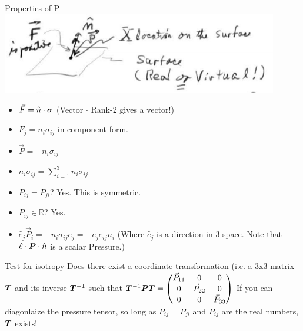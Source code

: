 \documentclass{article}
\begin{document}
\begin{section}{Properties of P}
  \includegraphics[height=100pt]{Day4NotesPics/Fdef}
  \begin{itemize}
    \item  $\vec{F} = \hat{n} \cdot \bm{\sigma}$ (Vector $\cdot$ Rank-2 gives a vector!)
    \item  $F_j = n_i \sigma_{ij}$ in component form.
    \item  $\vec{P} = -n_i \sigma_{ij}$ 
    \item  $n_i\sigma_{ij} = \sum\limits_{i=1}^3 n_i\sigma_{ij}$
    \item  $P_{ij} = P_{ji}$? Yes. This is symmetric.
    \item  $P_{ij} \in \mathbb{R}$? Yes.
    \item  $\hat{e}_j\vec{P}_i = -n_i\sigma_{ij}e_j = -e_j e_{ij} n_i$ (Where $\hat{e}_j$ is a direction in 3-space.  Note that $\hat{e}\cdot \bm{P} \cdot \hat{n}$ is a scalar Pressure.)
  \end{itemize}
\end{section}

\begin{section}{Test for isotropy}
  Does there exist a coordinate transformation (i.e. a 3x3 matrix $\bm{T}$ and its inverse $\bm{T}^{-1}$  such that 
  $\bm{T}^{-1} \bm{P} \bm{T} = 
  \begin{pmatrix}\vec{P}_{11} & 0 & 0 \\
  0 & \vec{P}_{22} &  0
  \\0 &  0 & \vec{P}_{33}
  \end{pmatrix}$ 
  If you can diagonlaize the pressure tensor, so long as $P_{ij} = P_{ji}$ and $P_{ij}$ are the real numbers, $\bm{T}$ exists!
\end{section}
\end{document}
